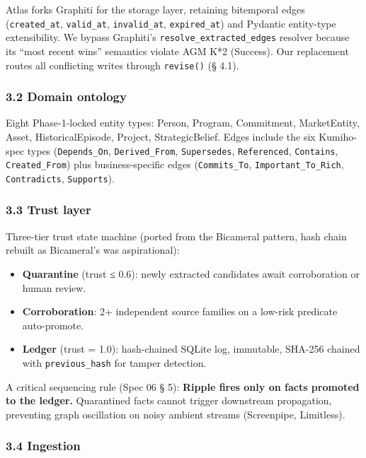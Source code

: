 \documentclass[
  11pt,
]{article}
\providecommand{\tightlist}{%
  \setlength{\itemsep}{0pt}\setlength{\parskip}{0pt}}
\begin{document}
Atlas forks Graphiti for the storage layer, retaining bitemporal edges
(\texttt{created\_at}, \texttt{valid\_at}, \texttt{invalid\_at},
\texttt{expired\_at}) and Pydantic entity-type extensibility. We bypass
Graphiti's \texttt{resolve\_extracted\_edges} resolver because its
``most recent wins'' semantics violate AGM K*2 (Success). Our
replacement routes all conflicting writes through \texttt{revise()} (§
4.1).

\subsubsection{3.2 Domain ontology}\label{domain-ontology}

Eight Phase-1-locked entity types: Person, Program, Commitment,
MarketEntity, Asset, HistoricalEpisode, Project, StrategicBelief. Edges
include the six Kumiho-spec types (\texttt{Depends\_On},
\texttt{Derived\_From}, \texttt{Supersedes}, \texttt{Referenced},
\texttt{Contains}, \texttt{Created\_From}) plus business-specific edges
(\texttt{Commits\_To}, \texttt{Important\_To\_Rich},
\texttt{Contradicts}, \texttt{Supports}).

\subsubsection{3.3 Trust layer}\label{trust-layer}

Three-tier trust state machine (ported from the Bicameral pattern, hash
chain rebuilt as Bicameral's was aspirational):

\begin{itemize}
\tightlist
\item
  \textbf{Quarantine} (trust ≤ 0.6): newly extracted candidates await
  corroboration or human review.
\item
  \textbf{Corroboration}: 2+ independent source families on a low-risk
  predicate auto-promote.
\item
  \textbf{Ledger} (trust = 1.0): hash-chained SQLite log, immutable,
  SHA-256 chained with \texttt{previous\_hash} for tamper detection.
\end{itemize}

A critical sequencing rule (Spec 06 § 5): \textbf{Ripple fires only on
facts promoted to the ledger.} Quarantined facts cannot trigger
downstream propagation, preventing graph oscillation on noisy ambient
streams (Screenpipe, Limitless).

\subsubsection{3.4 Ingestion}\label{ingestion}
\end{document}

